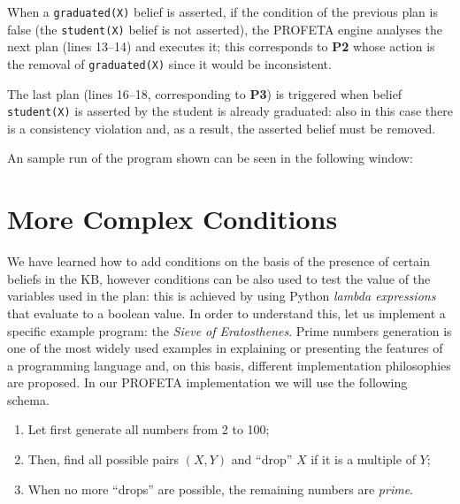 When a \texttt{graduated(X)} belief is asserted, if the condition of the
previous plan is false (the \texttt{student(X)} belief is not asserted),
the PROFETA engine analyses the next plan (lines
13--14) and executes it; this corresponds to \textbf{P2} whose action
is the removal of \texttt{graduated(X)} since it would be inconsistent.

The last plan (lines 16--18, corresponding to \textbf{P3}) is triggered
when belief \texttt{student(X)} is asserted by the student is already
graduated: also in this case there is a consistency violation and, as a
result, the asserted belief must be removed.

An sample run of the program shown can be seen in the following window:


\section{More Complex Conditions}
We have learned how to add conditions on the basis of the presence of
certain beliefs in the KB, however conditions can be also used to test the
value of the variables used in the plan: this is achieved by using Python
\emph{lambda expressions} that evaluate to a boolean value.
In order to understand this, let us implement a specific example program:
the \emph{Sieve of Eratosthenes}.
Prime numbers generation is one of the most widely used examples in
explaining or presenting the features of a programming language and, on
this basis, different implementation philosophies are proposed.
In our PROFETA implementation we will use the following schema.
\begin{enumerate}
\item Let first generate all numbers from 2 to 100;
\item Then, find all possible pairs $(X,Y)$ and ``drop'' $X$ if it is a
  multiple of $Y$;
\item When no more ``drops'' are possible, the remaining numbers are
  \emph{prime}.
\end{enumerate}

